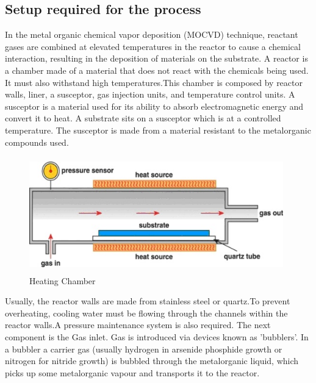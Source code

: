 \begin{flushleft}
\section{Setup required for the process}
\vspace{2mm}
In the metal organic chemical vapor deposition (MOCVD) technique, reactant gases are combined at elevated temperatures in the reactor to cause a chemical interaction, resulting in the deposition of materials on the substrate.
\vspace{3mm}
\newline
A reactor is a chamber made of a material that does not react with the chemicals being used. It must also withstand high temperatures.This chamber is composed by reactor walls, liner, a susceptor, gas injection units, and temperature control units.
\vspace{3mm}
\newline 
A susceptor is a material used for its ability to absorb electromagnetic energy and convert it to heat. A substrate sits on a susceptor which is at a controlled temperature. The susceptor is made from a material resistant to the metalorganic compounds used.
\vspace{5mm}
\newline
\begin{figure}[h!] 
	\centering
	\includegraphics[width=11cm, height=5cm]{images/pyrolisis.png} 
	\caption{Heating Chamber}
	\label{fig:img5} 
\end{figure}
\vspace{3mm}
\newline 
Usually, the reactor walls are made from stainless steel or quartz.To prevent overheating, cooling water must be flowing through the channels within the reactor walls.A pressure maintenance system is also required.
\vspace{3mm}
\newline
The next component is the Gas inlet. Gas is introduced via devices known as 'bubblers'. In a bubbler a carrier gas (usually hydrogen in arsenide  phosphide growth or nitrogen for nitride growth) is bubbled through the metalorganic liquid, which picks up some metalorganic vapour and transports it to the reactor.

\end{flushleft}

